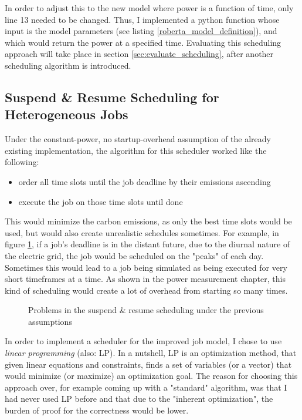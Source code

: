 In order to adjust this to the new model where power is a function of time, only line 13 needed to be changed. 
Thus, I implemented a python function whose input is the model parameters (see listing \ref{roberta_model_definition}), and which would return the power at a specified time. 
Evaluating this scheduling approach will take place in section \ref{sec:evaluate_scheduling}, after another scheduling algorithm is introduced.


\subsection{{Suspend \& Resume Scheduling for Heterogeneous Jobs}} \label{sec:checkpoint_resume_lp}

Under the constant-power, no startup-overhead assumption of the already existing implementation, the algorithm for this scheduler worked like the following:

\begin{itemize}
    \item order all time slots until the job deadline by their emissions ascending
    \item execute the job on those time slots until done
\end{itemize}

This would minimize the carbon emissions, as only the best time slots would be used, but would also create unrealistic schedules sometimes. 
For example, in figure \ref{fig:schedule_problems}, if a job's deadline is in the distant future, due to the diurnal nature of the electric grid, the job would be scheduled on the "peaks" of each day. Sometimes this would lead to a job being simulated as being executed for very short timeframes at a time. As shown in the power measurement chapter, this kind of scheduling would create a lot of overhead from starting so many times.

\begin{figure}
    \caption{Problems in the suspend \& resume scheduling under the previous assumptions}
    \label{fig:schedule_problems}
\end{figure}


In order to implement a scheduler for the improved job model, I chose to use \emph{linear programming} (also: LP).
In a nutshell, LP is an optimization method, that given linear equations and constraints, finds a set of variables (or a vector) that would minimize (or maximize) an optimization goal. 
The reason for choosing this approach over, for example coming up with a "standard" algorithm, was that I had never used LP before and that due to the "inherent optimization", the burden of proof for the correctness would be lower.

